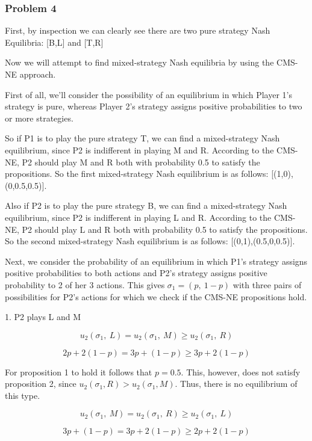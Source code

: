 \documentclass[a4paper]{article}
\begin{document}
\subsubsection{Problem 4}\label{problem4}

First, by inspection we can clearly see there are two pure strategy Nash
Equilibria: {[}B,L{]} and {[}T,R{]}

Now we will attempt to find mixed-strategy Nash equilibria by using the
CMS-NE approach.

First of all, we'll consider the possibility of an equilibrium in which
Player 1's strategy is pure, whereas Player 2's strategy assigns
positive probabilities to two or more strategies.

So if P1 is to play the pure strategy T, we can find a mixed-strategy
Nash equilibrium, since P2 is indifferent in playing M and R. According
to the CMS-NE, P2 should play M and R both with probability 0.5 to
satisfy the propositions. So the first mixed-strategy Nash equilibrium
is as follows: {[}(1,0),(0,0.5,0.5){]}.

Also if P2 is to play the pure strategy B, we can find a mixed-strategy
Nash equilibrium, since P2 is indifferent in playing L and R. According
to the CMS-NE, P2 should play L and R both with probability 0.5 to
satisfy the propositions. So the second mixed-strategy Nash equilibrium
is as follows: {[}(0,1),(0.5,0,0.5){]}.

Next, we consider the probability of an equilibrium in which P1's
strategy assigns positive probabilities to both actions and P2's
strategy assigns positive probability to 2 of her 3 actions. This gives
\(\sigma_{1} = (p,\ 1 - p)\) with three pairs of possibilities for P2's
actions for which we check if the CMS-NE propositions hold.

1. P2 plays L and M

\[u_{2}\left( \sigma_{1},\ L \right) = u_{2}\left( \sigma_{1},\ M \right) \geq u_{2}(\sigma_{1},\ R)\]

\[2p + 2\left( 1 - p \right) = 3p + \left( 1 - p \right) \geq 3p + 2\left( 1 - p \right)\]

For proposition 1 to hold it follows that \(p = 0.5\). This, however,
does not satisfy proposition 2, since
\(u_{2}\left( \sigma_{1},R \right) > u_{2}(\sigma_{1},M)\). Thus, there
is no equilibrium of this type.

\[u_{2}\left( \sigma_{1},\ M \right) = u_{2}\left( \sigma_{1},\ R \right) \geq u_{2}(\sigma_{1},\ L)\]

\[3p + \left( 1 - p \right) = 3p + 2\left( 1 - p \right) \geq 2p + 2\left( 1 - p \right)\]
\end{document}
